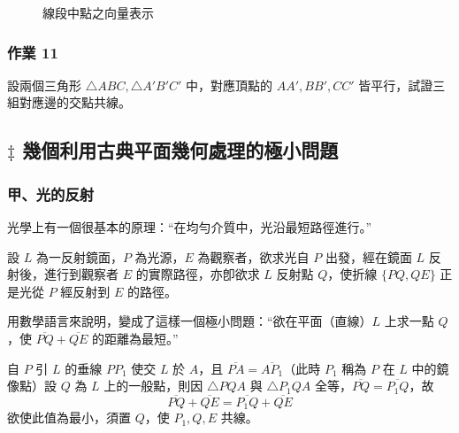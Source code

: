 \begin{figure}[H]
\centering
{}
\caption{線段中點之向量表示}
\label{fig:5-22}
\end{figure}

\subsubsection*{作業 11}
設兩個三角形 $\triangle ABC, \triangle A'B'C'$ 中，對應頂點的 $AA', BB', CC'$ 皆平行，試證三組對應邊的交點共線。

\subsection{\texorpdfstring{$\ddagger$ }{‡ }幾個利用古典平面幾何處理的極小問題}\label{sec:b3-5-4}

\subsubsection*{甲、光的反射}

光學上有一個很基本的原理：“在均勻介質中，光沿最短路徑進行。”

設 $L$ 為一反射鏡面，$P$ 為光源，$E$ 為觀察者，欲求光自 $P$ 出發，經在鏡面 $L$ 反射後，進行到觀察者 $E$ 的實際路徑，亦卽欲求 $L$ 反射點 $Q$，使折線 $\{PQ, QE\}$ 正是光從 $P$ 經反射到 $E$ 的路徑。

用數學語言來說明，變成了這樣一個極小問題：“欲在平面（直線）$L$ 上求一點 $Q$，使 $\overline{PQ} + \overline{QE}$ 的距離為最短。”

自 $P$ 引 $L$ 的垂線 $PP_1$ 使交 $L$ 於 $A$，且 $\overline{PA} = \overline{AP_1}$（此時 $P_1$ 稱為 $P$ 在 $L$ 中的鏡像點）設 $Q$ 為 $L$ 上的一般點，則因 $\triangle PQA$ 與 $\triangle P_1QA$ 全等，$\overline{PQ} = \overline{P_1Q}$，故
\[ \overline{PQ} + \overline{QE} = \overline{P_1Q} + \overline{QE} \]
欲使此值為最小，須置 $Q$，使 $P_1, Q, E$ 共線。

